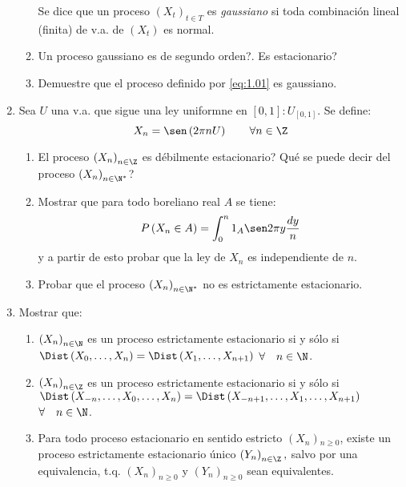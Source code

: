 \begin{enumerate}
\begin{enumerate}
\begin{definicion}
 Se dice que un proceso $(X_{t} )_{t\in T} $ es \emph{gaussiano} si toda combinaci\'{o}n lineal (finita) de v.a. de $(X_{t})$ es normal.
\end{definicion}

\item Un proceso gaussiano es de segundo orden?. Es estacionario?
\item Demuestre que el proceso definido por \eqref{eq:1.01} es gaussiano.
\end{enumerate}

\item Sea $U$ una v.a. que sigue una ley uniformne en $[0,1]:U_{\left[ {0,1} \right]} $. Se define:
\[
X_{n} =\sen\left( {2\pi nU} \right)\qquad \forall n\in \Z
\]
\begin{enumerate}
\item El proceso $\left( {X_{n} } \right)_{n\in \Z} $ es d\'{e}bilmente estacionario? Qu\'{e} se puede decir del proceso $\left( {X_{n} } \right)_{n\in \N^{\ast }} $? 

\item Mostrar que para todo boreliano real $A$ se tiene:
\[
P\left( {X_{n} \in { A}} \right)= \int_{0}^{n} 1_{A} \sen 2\pi y \frac{dy}{n}
\]
y a partir de esto probar que la ley de $X_{n} $ es independiente de $n$.

\item Probar que el proceso $\left( {X_{n} } \right)_{n\in \N^{\ast }} $ no es estrictamente estacionario.
\end{enumerate}

\item Mostrar que:
\begin{enumerate}
\item $\left( {X_{n} } \right)_{n\in {\N}} $ es un proceso estrictamente estacionario si y s\'{o}lo si $\Dist\left( {X_{0} ,\ldots,X_{n} } \right)=\Dist\left( {X_{1} ,\ldots,X_{n+1} } \right)$ $\forall \quad n\in {\N}$.
\item $\left( {X_{n} } \right)_{n\in {\Z}} $ es un proceso estrictamente estacionario si y s\'{o}lo si $\Dist\left( {X_{-n} ,\ldots,X_{0} ,\ldots, X_{n} } \right)=\Dist\left( {X_{-n+1} ,\ldots,X_{1} ,\ldots,X_{n+1} } \right)$ $\forall \quad n\in {\N}$.
\item Para todo proceso estacionario en sentido estricto $\left( {X_{n} } \right){ }_{n\geq 0}$, existe un proceso estrictamente estacionario \'{u}nico $\left( {Y_{n} } \right)_{n\in {\Z}} ,$ salvo por una equivalencia, t.q. $\left( {X_{n} } \right)_{n\geq 0} $ y $\left( {Y_{n} } \right)_{n\geq 0} $ sean equivalentes.
\end{enumerate}


\end{enumerate}
